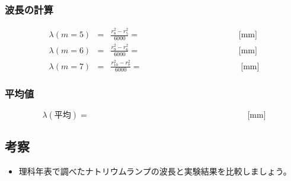 \newpage

\subsubsection*{波長の計算}
\begin{eqnarray}
\lambda(m=5) &=& \frac{r_8^2-r_5^2}{6000} = \hspace{5cm} \text{[mm]}\nonumber\\
\lambda(m=6) &=& \frac{r_9^2-r_6^2}{6000} =  \hspace{5cm} \text{[mm]}\nonumber\\
\lambda(m=7) &=& \frac{r_{10}^2-r_7^2}{6000} =\hspace{5cm} \text{[mm]}\nonumber
\end{eqnarray}

\subsubsection*{平均値}

\begin{equation}
\lambda(平均)= \hspace{8cm}\text{[mm]}\nonumber
\end{equation}


\subsection*{考察}

\begin{itemize}

\item 理科年表で調べたナトリウムランプの波長と実験結果を比較しましょう。

\end{itemize}

